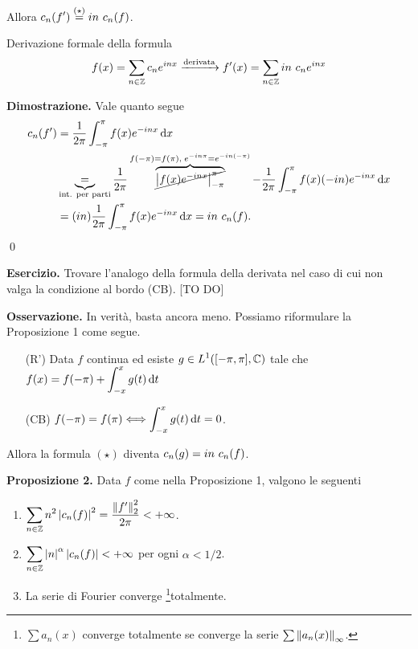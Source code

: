 Allora $\displaystyle c_n(f') \overset{(\star)}{=} in \ c_n(f)$.

Derivazione formale della formula
%
$$
f(x) = \sum_{n \in \mathbb Z} c_n e^{inx} \xrightarrow{\text{derivata}} f'(x) = \sum_{n \in \mathbb Z} in \ c_n e^{inx} 
$$
%

\textbf{Dimostrazione.} Vale quanto segue
\begin{align*}
c_n(f') & = \frac{1}{2\pi} \int_{-\pi}^\pi f(x) e^{-inx} \dd x \\
& \underbrace{=}_{\text{int. per parti}} \frac{1}{2\pi} \overbrace{\cancel{\left| f(x) e^{-inx} \right|_{-\pi}^\pi}}^{f(-\pi) = f(\pi), \; e^{-in\pi} = e^{-in (-\pi)}} - \frac{1}{2\pi} \int_{-\pi}^\pi f(x) (-in) e^{-inx} \dd x \\
& = (in) \frac{1}{2\pi} \int_{-\pi}^\pi f(x) e^{-inx} \dd x = in \ c_n(f).
\end{align*} 
\qed

\textbf{Esercizio.} Trovare l'analogo della formula della derivata nel caso di cui non valga la condizione al bordo (CB). [TO DO]

\textbf{Osservazione.} In verità, basta ancora meno. Possiamo riformulare la Proposizione 1 come segue.
\begin{itemize}
\item[(R')] Data $f$ continua ed esiste $\displaystyle g \in L^1([-\pi,\pi], \mathbb C) $ tale che $\displaystyle f(x) = f(-\pi) + \int_{-x}^x g(t) \,\mathrm{d} t $ 

\item[(CB)] $\displaystyle f(-\pi) = f(\pi) \Longleftrightarrow \int_{-x}^x g(t) \,\mathrm{d} t = 0 $.
\end{itemize}
Allora la formula $(\star)$ diventa $\displaystyle c_n(g) = in \ c_n(f)$.

\textbf{Proposizione 2.} Data $f$ come nella Proposizione 1, valgono le seguenti
\begin{enumerate}
\item $\displaystyle \sum_{n \in \mathbb Z} n^2 \left| c_n(f) \right|^2 = \frac{\left\lVert f' \right\rVert_2^2}{2\pi} < +\infty$.

\item $\displaystyle \sum_{n \in \mathbb Z} \left| n \right|^\alpha \left| c_n(f) \right| < +\infty $ per ogni $\alpha < 1/2$.

\item La serie di Fourier converge \footnote{$\sum a_n(x)$ converge totalmente se converge la serie $\sum \left\lVert a_n (x) \right\rVert_\infty$.}{totalmente}.
\end{enumerate}

